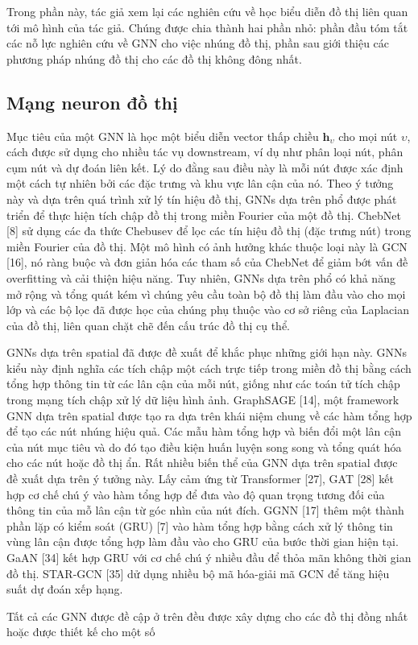 Trong phần này, tác giả xem lại các nghiên cứu về học biểu diễn đồ thị liên quan tới mô hình của tác giả. Chúng được chia thành hai phần nhỏ: phần đầu tóm tắt các nỗ lực nghiên cứu về GNN cho việc nhúng đồ thị, phần sau giới thiệu các phương pháp nhúng đồ thị cho các đồ thị không đông nhất.

\subsection{Mạng neuron đồ thị}
Mục tiêu của một GNN là học một biểu diễn vector thấp chiều $\pmb{h}_{\upsilon}$ cho mọi nút $\upsilon$, cách được sử dụng cho nhiều tác vụ downstream, ví dụ như phân loại nút, phân cụm nút và dự đoán liên kết. Lý do đằng sau điều này là mỗi nút được xác định một cách tự nhiên bởi các đặc trưng và khu vực lân cận của nó. Theo ý tưởng này và dựa trên quá trình xử lý tín hiệu đồ thị, GNNs dựa trên phổ được phát triển để thực hiện tích chập đồ thị trong miền Fourier của một đồ thị. ChebNet [8] sử dụng các đa thức Chebusev để lọc các tín hiệu đồ thị (đặc trưng nút) trong miền Fourier của đồ thị. Một mô hình có ảnh hưởng khác thuộc loại này là GCN [16], nó ràng buộc và đơn giản hóa các tham số của ChebNet để giảm bớt vấn đề overfitting và cải thiện hiệu năng. Tuy nhiên, GNNs dựa trên phổ có khả năng mở rộng và tổng quát kém vì chúng yêu cầu toàn bộ đồ thị làm đầu vào cho mọi lớp và các bộ lọc đã được học của chúng phụ thuộc vào cơ sở riêng của Laplacian của đồ thị, liên quan chặt chẽ đến cấu trúc đồ thị cụ thể.

GNNs dựa trên spatial đã được đề xuất để khắc phục những giới hạn này. GNNs kiểu này định nghĩa các tích chập một cách trực tiếp trong miền đồ thị bằng cách tổng hợp thông tin từ các lân cận của mỗi nút, giống như các toán tử tích chập trong mạng tích chập xử lý dữ liệu hình ảnh. GraphSAGE [14], một framework GNN dựa trên spatial được tạo ra dựa trên khái niệm chung về các hàm tổng hợp để tạo các nút nhúng hiệu quả. Các mẫu hàm tổng hợp và biến đổi một lân cận của nút mục tiêu và do đó tạo điều kiện huấn luyện song song và tổng quát hóa cho các nút hoặc đồ thị ẩn. Rất nhiều biến thể của GNN dựa trên spatial được đề xuất dựa trên ý tưởng này. Lấy cảm ứng từ Transformer [27], GAT [28] kết hợp cơ chế chú ý vào hàm tổng hợp để đưa vào độ quan trọng tương đối của thông tin của mỗ lân cận từ góc nhìn của nút đích. GGNN [17] thêm một thành phần lặp có kiểm soát (GRU) [7] vào hàm tổng hợp bằng cách xử lý thông tin vùng lân cận được tổng hợp làm đầu vào cho GRU của bước thời gian hiện tại. GaAN [34] kết hợp GRU với cơ chế chú ý nhiều đầu để  thỏa mãn không thời gian đồ thị. STAR-GCN [35] dử dụng nhiều bộ mã hóa-giải mã GCN để
tăng hiệu suất dự đoán xếp hạng. 

Tất cả các GNN được đề cập ở trên đều được xây dựng cho các đồ thị đồng nhất hoặc được thiết kế cho một số 